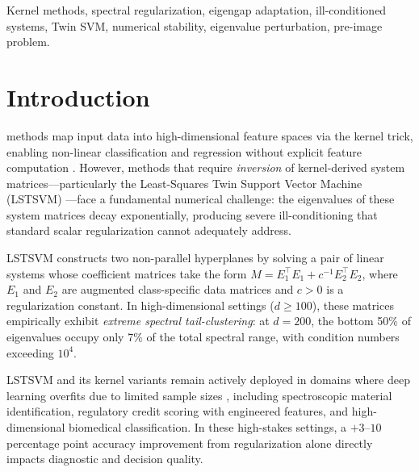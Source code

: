 \documentclass[journal]{IEEEtran}
\begin{document}
\begin{IEEEkeywords}
Kernel methods, spectral regularization, eigengap adaptation, ill-conditioned systems, Twin SVM, numerical stability, eigenvalue perturbation, pre-image problem.
\end{IEEEkeywords}



\section{Introduction}
\label{sec:introduction}

 methods map input data into high-dimensional feature spaces via the kernel trick, enabling non-linear classification and regression without explicit feature computation \cite{cortes1995support, hofmann2008kernel}. However, methods that require \emph{inversion} of kernel-derived system matrices---particularly the Least-Squares Twin Support Vector Machine (LSTSVM) \cite{kumar2009lstsvm}---face a fundamental numerical challenge: the eigenvalues of these system matrices decay exponentially, producing severe ill-conditioning that standard scalar regularization cannot adequately address.

LSTSVM constructs two non-parallel hyperplanes by solving a pair of linear systems whose coefficient matrices take the form $M = E_1^\top E_1 + c^{-1} E_2^\top E_2$, where $E_1$ and $E_2$ are augmented class-specific data matrices and $c > 0$ is a regularization constant. In high-dimensional settings ($d \geq 100$), these matrices empirically exhibit \emph{extreme spectral tail-clustering}: at $d{=}200$, the bottom 50\% of eigenvalues occupy only 7\% of the total spectral range, with condition numbers exceeding $10^4$.

LSTSVM and its kernel variants remain actively deployed in domains where deep learning overfits due to limited sample sizes \cite{tanveer2022comprehensive}, including spectroscopic material identification, regulatory credit scoring with engineered features, and high-dimensional biomedical classification. In these high-stakes settings, a $+3$--$10$ percentage point accuracy improvement from regularization alone directly impacts diagnostic and decision quality.
\end{document}
